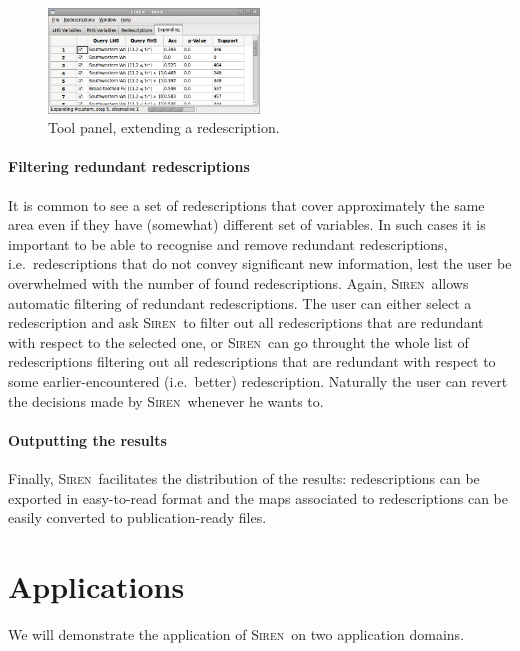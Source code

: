 \documentclass{sig-alternate}
\newcommand{\prg}[1]{\paragraph{#1}}
\newcommand{\Siren}{\textsc{Siren}}
\begin{document}
\begin{figure}
  \centering
\includegraphics[width=0.5\textwidth]{screenshots/extending.png}
  \caption{Tool panel, extending a redescription.}
  \label{fig:extending}
\end{figure}



\prg{Filtering redundant redescriptions}
\label{sec:filt-redund-redescr}
It is common to see a set of redescriptions that cover approximately
the same area even if they have (somewhat) different set of
variables. In such cases it is important to be able to recognise and
remove redundant redescriptions, i.e.\ redescriptions that do not
convey significant new information, lest the user be overwhelmed with
the number of found redescriptions. Again, \Siren\ allows automatic
filtering of redundant redescriptions. The user can either select a
redescription and ask \Siren\ to filter out all redescriptions that
are redundant with respect to the selected one, or \Siren\
can go throught the whole list of redescriptions filtering out all
redescriptions that are redundant with respect to some
earlier-encountered (i.e.\ better) redescription. Naturally the user
can revert the decisions made by \Siren\ whenever he wants to.



\prg{Outputting the results}
\label{sec:outputting-results}
Finally, \Siren\ facilitates the distribution of the results:
redescriptions can be exported in easy-to-read format and the
maps associated to redescriptions can be easily converted to
publication-ready files. 

\section{Applications}
We will demonstrate the application of \Siren\ on two application domains. 
\end{document}
